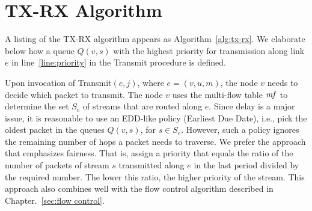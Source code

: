 \documentclass[12pt,oneside,english,a4paper]{book}
\theoremstyle{plain}
\theoremstyle{definition}
\theoremstyle{Theorem}
\theoremstyle{plain}
\newenvironment{proof sketch}[1]{\noindent {\emph{Proof sketch of #1:}}}{\hfill \qed}
\newcommand{\mf}{\text{\emph{mf}}}
\begin{document}
\chapter{TX-RX Algorithm} \label{sec:algs}
A listing of the TX-RX algorithm appears as Algorithm~\ref{alg:tx-rx}.
We elaborate below how a queue $Q(v,s)$ with the highest priority for
transmission along link $e$ in line~\ref{line:priority} in the
Transmit procedure is defined.

Upon invocation of Transmit$(e,j)$, where $e=(v,u,m)$, the node $v$
needs to decide which packet to transmit. The node $v$ uses the
multi-flow table $\mf$ to determine the set $S_e$ of streams that are
routed along $e$.  Since delay is a major issue, it is reasonable to
use an EDD-like policy (Earliest Due Date), i.e., pick the oldest packet in the queues
$Q(v,s)$, for $s\in S_e$.  However, such a policy ignores the
remaining number of hops a packet needs to traverse. We prefer the
approach that emphasizes fairness. That is, assign a priority that
equals the ratio of the number of packets of stream $s$ transmitted
along $e$ in the last period divided by the required number. The lower
this ratio, the higher priority of the stream. This approach also
combines well with the flow control algorithm described in
Chapter.~\ref{sec:flow control}.
\end{document}
